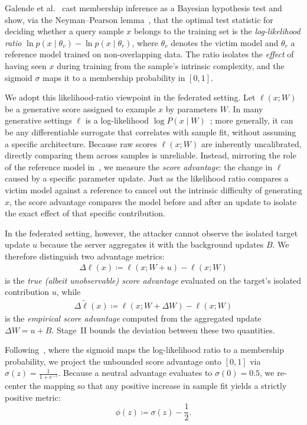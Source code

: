 \documentclass{article}
\theoremstyle{plain}
\theoremstyle{definition}
\theoremstyle{remark}
\numberwithin{theorem}{section}
\numberwithin{definition}{section}
\numberwithin{remark}{section}
\numberwithin{lemma}{section}
\numberwithin{assumption}{section}
\newcommand{\utarget}{u}
\begin{document}
Galende et al.~\cite{Galende2025Membership} cast membership inference as a Bayesian hypothesis test and show, via the Neyman--Pearson lemma~\cite{neyman1933ix}, that the optimal test statistic for deciding whether a query sample $x$ belongs to the training set is the \emph{log-likelihood ratio}
$\ln p(x\mid\theta_v)-\ln p(x\mid\theta_r)$,
where $\theta_v$ denotes the victim model and $\theta_r$ a reference model trained on non-overlapping data.
The ratio isolates the \emph{effect} of having seen $x$ during training from the sample's intrinsic complexity, and the sigmoid $\sigma$ maps it to a membership probability in $[0,1]$.

We adopt this likelihood-ratio viewpoint in the federated setting.
Let $\ell(x;W)$ be a generative score assigned to example $x$ by parameters $W$.
In many generative settings $\ell$ is a log-likelihood $\log P(x\mid W)$~\cite{carlini2022membership}; more generally, it can be any differentiable surrogate that correlates with sample fit, without assuming a specific architecture.
Because raw scores $\ell(x;W)$ are inherently uncalibrated, directly comparing them across samples is unreliable.
Instead, mirroring the role of the reference model in~\cite{Galende2025Membership}, we measure the \emph{score advantage}: the change in $\ell$ caused by a specific parameter update.
Just as the likelihood ratio compares a victim model against a reference to cancel out the intrinsic difficulty of generating $x$, the score advantage compares the model before and after an update to isolate the exact effect of that specific contribution.

In the federated setting, however, the attacker cannot observe the isolated target update $\utarget$ because the server aggregates it with the background updates $B$. We therefore distinguish two advantage metrics:
\begin{align}
    \Delta\ell(x) \coloneqq \ell(x;W + \utarget) - \ell(x;W)
\end{align}
is the \emph{true (albeit unobservable) score advantage} evaluated on the target's isolated contribution $\utarget$, while
\begin{align}
    \Delta\tilde\ell(x) \coloneqq \ell(x;W + \Delta W) - \ell(x;W)
\end{align}
is the \emph{empirical score advantage} computed from the aggregated update $\Delta W = \utarget + B$. Stage~II bounds the deviation between these two quantities.

Following~\cite{Galende2025Membership}, where the sigmoid maps the log-likelihood ratio to a membership probability, we project the unbounded score advantage onto $[0,1]$ via $\sigma(z) = \frac{1}{1+e^{-z}}$. Because a neutral advantage evaluates to $\sigma(0)=0.5$, we re-center the mapping so that any positive increase in sample fit yields a strictly positive metric:
\begin{equation}
\label{eq:phi_def}
\phi(z) \coloneqq \sigma(z) - \frac{1}{2}.
\end{equation}
\end{document}
